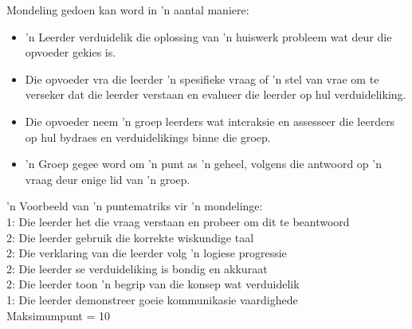 Mondeling gedoen kan word in 'n aantal maniere:
\begin{itemize}[noitemsep]
\item
  'n Leerder verduidelik die oplossing van 'n ​​huiswerk probleem wat deur die opvoeder gekies is.
\item
  Die opvoeder vra die leerder 'n spesifieke vraag of 'n stel van vrae om te verseker dat die leerder verstaan ​​en evalueer die leerder op hul verduideliking.
\item
  Die opvoeder neem 'n groep leerders wat interaksie en assesseer die leerders op hul bydraes en verduidelikings binne die groep.
\item
  'n Groep gegee word om 'n punt as 'n geheel, volgens die antwoord op 'n vraag deur enige lid van 'n groep.
\end{itemize}
'n Voorbeeld van 'n ​​puntematriks vir 'n mondelinge:\\
1: Die leerder het die vraag verstaan ​​en probeer om dit te beantwoord\\
2: Die leerder gebruik die korrekte wiskundige taal\\
2: Die verklaring van die leerder volg 'n logiese progressie\\
2: Die leerder se verduideliking is bondig en akkuraat\\
2: Die leerder toon 'n begrip van die konsep wat verduidelik\\
1: Die leerder demonstreer goeie kommunikasie vaardighede\\
Maksimumpunt = 10

